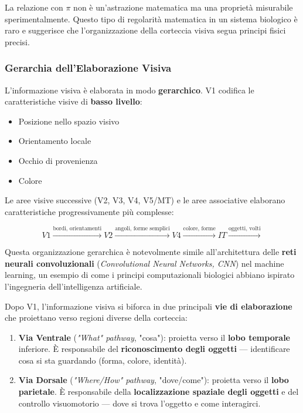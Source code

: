\begin{tcolorbox}[colback=gray!5, colframe=gray!40, arc=2mm, boxrule=0.5pt]
La relazione con $\pi$ non è un'astrazione matematica ma una proprietà misurabile sperimentalmente. Questo tipo di regolarità matematica in un sistema biologico è raro e suggerisce che l'organizzazione della corteccia visiva segua principi fisici precisi.
\end{tcolorbox}



\subsubsection{Gerarchia dell'Elaborazione Visiva}

L'informazione visiva è elaborata in modo \textbf{gerarchico}. V1 codifica le caratteristiche visive di \textbf{basso livello}:
\begin{itemize}
    \item Posizione nello spazio visivo
    \item Orientamento locale
    \item Occhio di provenienza
    \item Colore
\end{itemize}

Le aree visive successive (V2, V3, V4, V5/MT) e le aree associative elaborano caratteristiche progressivamente più complesse:

$$ V1 \xrightarrow{\text{bordi, orientamenti}} V2 \xrightarrow{\text{angoli, forme semplici}} V4 \xrightarrow{\text{colore, forme}} IT \xrightarrow{\text{oggetti, volti}} $$

\begin{tcolorbox}[colback=gray!5, colframe=gray!40, arc=2mm, boxrule=0.5pt]
Questa organizzazione gerarchica è notevolmente simile all'architettura delle \textbf{reti neurali convoluzionali} (\textit{Convolutional Neural Networks, CNN}) nel machine learning, un esempio di come i principi computazionali biologici abbiano ispirato l'ingegneria dell'intelligenza artificiale.
\end{tcolorbox}


Dopo V1, l'informazione visiva si biforca in due principali \textbf{vie di elaborazione} che proiettano verso regioni diverse della corteccia:

\begin{enumerate}
    \item \textbf{Via Ventrale} (\textit{"What" pathway}, "cosa"): proietta verso il \textbf{lobo temporale} inferiore. È responsabile del \textbf{riconoscimento degli oggetti} — identificare cosa si sta guardando (forma, colore, identità).
    \item \textbf{Via Dorsale} (\textit{"Where/How" pathway}, "dove/come"): proietta verso il \textbf{lobo parietale}. È responsabile della \textbf{localizzazione spaziale degli oggetti} e del controllo visuomotorio — dove si trova l'oggetto e come interagirci.
\end{enumerate}

